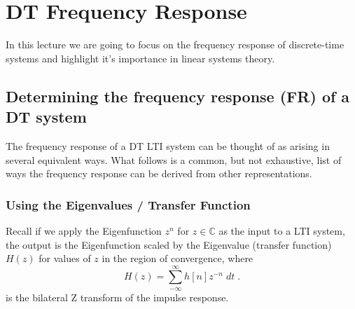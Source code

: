 \chapter{DT Frequency Response}

In this lecture we are going to focus on the frequency response of discrete-time systems and highlight it's importance in linear systems theory.

\section{Determining the frequency response (FR) of a DT system}

The frequency response of a DT LTI system can be thought of as arising in several equivalent ways. What follows is a common, but not exhaustive, list of ways the frequency response can be derived from other representations.

\subsection*{Using the Eigenvalues / Transfer Function}

Recall if we apply the Eigenfunction $z^{n}$ for $z \in \mathbb{C}$ as the input to a LTI system, the output is the Eigenfunction scaled by the Eigenvalue (transfer function) $H(z)$ for values of $z$ in the region of convergence, where
\[
H(z) = \sum\limits_{-\infty}^{\infty} h[n] z^{-n}\; dt \; .
\]
is the bilateral Z transform of the impulse response.

